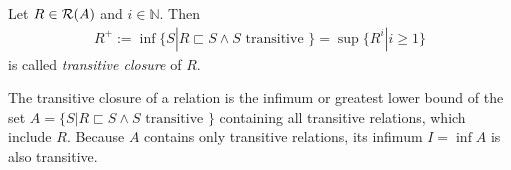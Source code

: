 \begin{definition}
Let $R \in \mathcal{R}(A)$ and $i \in \mathbb{N}$.
Then
\begin{align}
R^{+}
:= \inf \{ S | R \sqsubset S \wedge S \text{ transitive } \}
= \sup \{ R^{i} | i \geq 1 \}
\end{align}
is called \emph{transitive closure} of $R$.
\end{definition}

The transitive closure of a relation is the infimum or greatest lower bound of the set $A = \{ S | R \sqsubset S \wedge S \text{ transitive } \}$ containing all transitive relations, which include $R$.
Because $A$ contains only transitive relations, its infimum $I = \inf A$ is also transitive.

